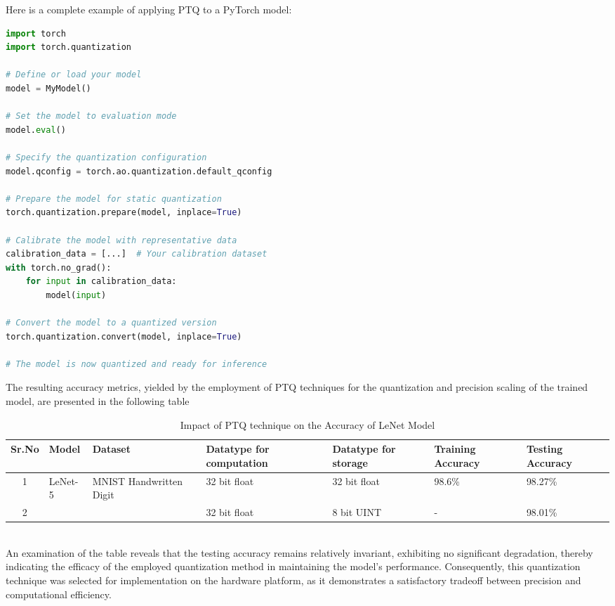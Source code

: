 Here is a complete example of applying PTQ to a PyTorch model:\\
\begin{lstlisting}[language=Python, caption=PyTorch Post Training Static Quantization]
import torch
import torch.quantization

# Define or load your model
model = MyModel()

# Set the model to evaluation mode
model.eval()

# Specify the quantization configuration
model.qconfig = torch.ao.quantization.default_qconfig

# Prepare the model for static quantization
torch.quantization.prepare(model, inplace=True)

# Calibrate the model with representative data
calibration_data = [...]  # Your calibration dataset
with torch.no_grad():
    for input in calibration_data:
        model(input)

# Convert the model to a quantized version
torch.quantization.convert(model, inplace=True)

# The model is now quantized and ready for inference
\end{lstlisting}
The resulting accuracy metrics, yielded by the employment of PTQ techniques for the quantization and precision scaling of the trained model, are presented in the following table
\begin{table}[h]
    \centering
    \begin{tabularx}{1.1\textwidth}{|c|X|X|X|X|X|X|}
        \hline
        \textbf{Sr.No} & \textbf{Model} & \textbf{Dataset}  & \textbf{Datatype for computation} & \textbf{Datatype for storage} & \textbf{Training Accuracy} & \textbf{Testing Accuracy} \\
        \hline
        1 & \multirow{2}{*}{LeNet-5}  & MNIST Handwritten Digit  & 32 bit float  & 32 bit float  & 98.6\% & 98.27\% \\\cline{4 - 7}
        
        2 &  &   & 32 bit float  & 8 bit UINT  & - & 98.01\% \\\hline

   
    \end{tabularx}
    \caption{Impact of PTQ technique on the Accuracy of LeNet Model}
    \label{tab:PTQ_comparison}
\end{table}\\
An examination of the table reveals that the testing accuracy remains relatively invariant, exhibiting no significant degradation, thereby indicating the efficacy of the employed quantization method in maintaining the model's performance. Consequently, this quantization technique was selected for implementation on the hardware platform, as it demonstrates a satisfactory tradeoff between precision and computational efficiency.

